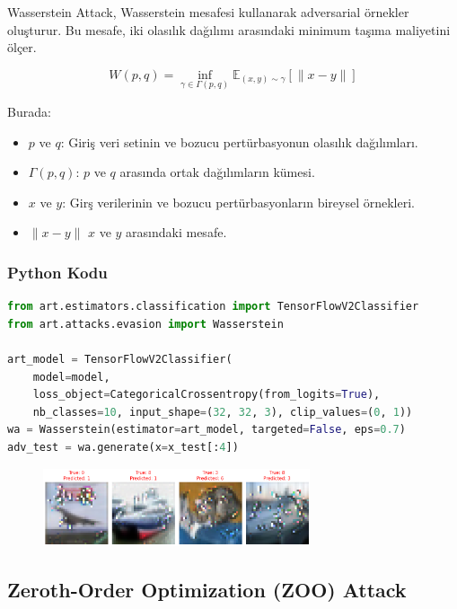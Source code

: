 Wasserstein Attack, Wasserstein mesafesi kullanarak adversarial örnekler oluşturur. Bu mesafe, iki olasılık dağılımı arasındaki minimum taşıma maliyetini ölçer.

\[ W(p, q) = \inf_{\gamma \in \Gamma(p, q)} \mathbb{E}_{(x, y) \sim \gamma}[\| x - y \|] \]

Burada:

\begin{itemize}
    \item $p$ ve $q$: Giriş veri setinin ve bozucu pertürbasyonun olasılık dağılımları.
    \item $\Gamma(p, q)$: $p$ ve $q$ arasında ortak dağılımların kümesi.
    \item $x$ ve $y$: Girş verilerinin ve bozucu pertürbasyonların bireysel örnekleri.
    \item $\| x - y \|$ $x$ ve $y$ arasındaki mesafe.
\end{itemize}

\subsubsection{Python Kodu}

\begin{lstlisting}[language=Python]
from art.estimators.classification import TensorFlowV2Classifier
from art.attacks.evasion import Wasserstein

art_model = TensorFlowV2Classifier(
    model=model,
    loss_object=CategoricalCrossentropy(from_logits=True), 
    nb_classes=10, input_shape=(32, 32, 3), clip_values=(0, 1))
wa = Wasserstein(estimator=art_model, targeted=False, eps=0.7)
adv_test = wa.generate(x=x_test[:4])
\end{lstlisting}

\begin{figure}[h]
    \centering
    \includegraphics[width=0.7\textwidth]{images/wasserstein_attack_results.png}
    \caption{}
\end{figure}

\newpage

\subsection{Zeroth-Order Optimization (ZOO) Attack}


